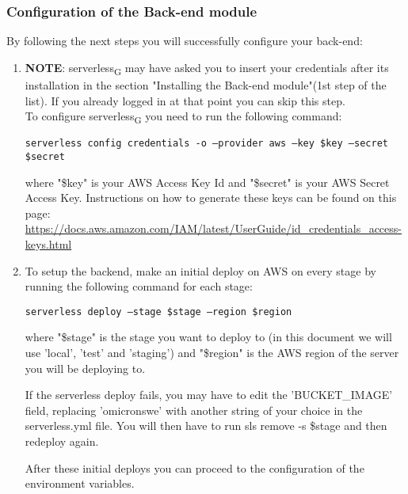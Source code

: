 \subsubsection{Configuration of the Back-end module}
By following the next steps you will successfully configure your back-end:
\begin{enumerate}
\item \textbf{NOTE}: serverless\textsubscript{G} may have asked you to insert your credentials after its installation in the section "Installing the Back-end module"(1st step of the list). If you already logged in at that point you can skip this step.\\ 
To configure serverless\textsubscript{G} you need to run the following command:
\begin{center}
\texttt{serverless config credentials -o --provider aws --key \$key --secret \$secret}
\end{center}
where "\$key" is your AWS Access Key Id and "\$secret" is your AWS Secret Access Key.
Instructions on how to generate these keys can be found on this page: \url{https://docs.aws.amazon.com/IAM/latest/UserGuide/id_credentials_access-keys.html}

\item To setup the backend, make an initial deploy on AWS on every stage by running the following command for each stage:
\begin{center}
\texttt{serverless deploy --stage \$stage --region \$region}
\end{center}
where "\$stage" is the stage you want to deploy to (in this document we will use 'local', 'test' and 'staging') and "\$region" is the AWS region of the server you will be deploying to.

If the serverless deploy fails, you may have to edit the 'BUCKET\_IMAGE' field, replacing 'omicronswe' with another string of your choice in the serverless.yml file. You will then have to run sls remove -s \$stage and then redeploy again.

After these initial deploys you can proceed to the configuration of the environment variables.
\end{enumerate}

